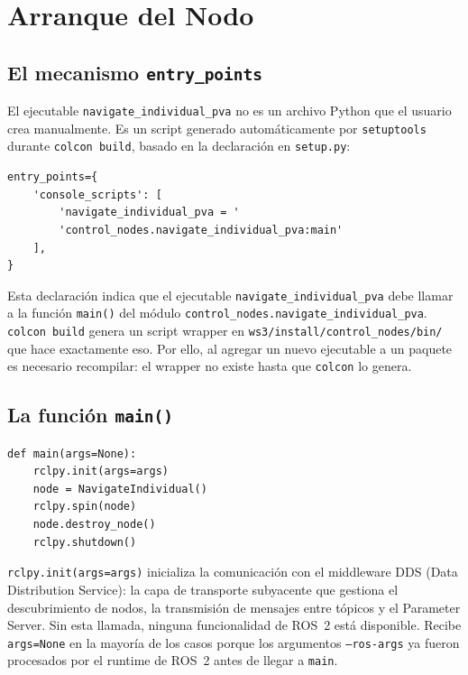 \section{Arranque del Nodo}

\subsection{El mecanismo \texttt{entry\_points}}

El ejecutable \texttt{navigate\_individual\_pva} no es un archivo Python que el usuario crea manualmente. Es un script generado automáticamente por \texttt{setuptools} durante \texttt{colcon build}, basado en la declaración en \texttt{setup.py}:

\begin{lstlisting}[style=python, caption={Declaración del ejecutable en \texttt{setup.py}.}]
entry_points={
    'console_scripts': [
        'navigate_individual_pva = '
        'control_nodes.navigate_individual_pva:main'
    ],
}
\end{lstlisting}

Esta declaración indica que el ejecutable \texttt{navigate\_individual\_pva} debe llamar a la función \texttt{main()} del módulo \texttt{control\_nodes.navigate\_individual\_pva}. \texttt{colcon build} genera un script wrapper en \texttt{ws3/install/control\_nodes/bin/} que hace exactamente eso. Por ello, al agregar un nuevo ejecutable a un paquete es necesario recompilar: el wrapper no existe hasta que \texttt{colcon} lo genera.

\subsection{La función \texttt{main()}}

\begin{lstlisting}[style=python, caption={Función \texttt{main()} típica de un nodo ROS~2.}]
def main(args=None):
    rclpy.init(args=args)
    node = NavigateIndividual()
    rclpy.spin(node)
    node.destroy_node()
    rclpy.shutdown()
\end{lstlisting}

\texttt{rclpy.init(args=args)} inicializa la comunicación con el middleware DDS (Data Distribution Service): la capa de transporte subyacente que gestiona el descubrimiento de nodos, la transmisión de mensajes entre tópicos y el Parameter Server. Sin esta llamada, ninguna funcionalidad de ROS~2 está disponible. Recibe \texttt{args=None} en la mayoría de los casos porque los argumentos \texttt{--ros-args} ya fueron procesados por el runtime de ROS~2 antes de llegar a \texttt{main}.

